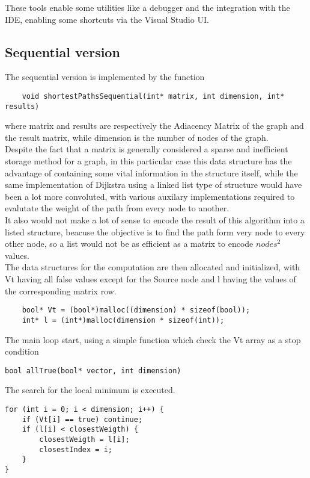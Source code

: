\documentclass[
	a4paper, %
	12pt, %
]{class}
\begin{document}
These tools enable some utilities like a debugger and the integration with the IDE, enabling some shortcuts via the Visual Studio UI. \\

\subsection{Sequential version}
The sequential version is implemented by the function

\begin{verbatim}
    void shortestPathsSequential(int* matrix, int dimension, int* results)
\end{verbatim}

where matrix and results are respectively the Adiacency Matrix of the graph and the result matrix, while dimension is the number
of nodes of the graph.\\

Despite the fact that a matrix is generally considered a sparse and inefficient storage method for a graph, in this particular case this data structure
has the advantage of containing some vital information in the structure itself, while the same implementation of Dijkstra using a linked list type of structure 
would have been a lot more convoluted, with various auxilary implementations required to evalutate the weight of the path from every node to another.\\

It also would not make a lot of sense to encode the result of this algorithm into a listed structure, beacuse the objective is to find the path form very node to every other node,
so a list would not be as efficient as a matrix to encode $nodes^2$ values.\\

The data structures for the computation are then allocated and initialized, with Vt having all false values except for the Source node
and l having the values of the corresponding matrix row.
\begin{verbatim}
    bool* Vt = (bool*)malloc((dimension) * sizeof(bool));
    int* l = (int*)malloc(dimension * sizeof(int));
\end{verbatim}

The main loop start, using a simple function which check the Vt array as a stop condition
\begin{verbatim}
bool allTrue(bool* vector, int dimension)
\end{verbatim}

The search for the local minimum is executed.
\begin{verbatim}
for (int i = 0; i < dimension; i++) {
    if (Vt[i] == true) continue;
    if (l[i] < closestWeigth) {
        closestWeigth = l[i];
        closestIndex = i;
    }
}
\end{verbatim}
\end{document}
